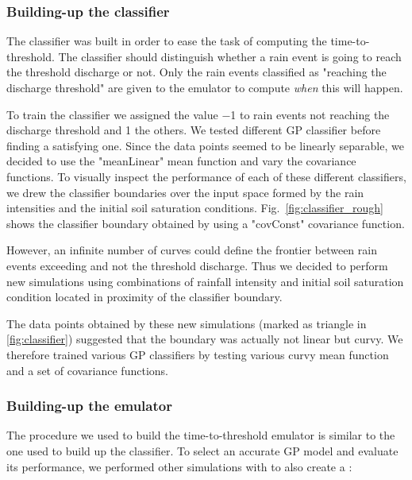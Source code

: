 \subsubsection{Building-up the classifier}

The classifier was built in order to ease the task of computing the time-to-threshold.
The classifier should distinguish whether a rain event is going to reach the threshold discharge or not.
Only the rain events classified as "reaching the discharge threshold" are given to the emulator to compute \emph{when} this will happen.

To train the classifier we assigned the value \num{-1} to rain events not reaching the discharge threshold and \num{1} the others.  
We tested different GP classifier before finding a satisfying one.
Since the data points seemed to be linearly separable, we decided to use the "meanLinear" mean function and vary
the covariance functions.
To visually inspect the performance of each of these different classifiers, we drew the classifier boundaries over the input space formed by the rain intensities and the initial soil saturation conditions. Fig.~\ref{fig:classifier_rough} shows the classifier boundary obtained by using a "covConst" covariance function.
 
However, an infinite number of curves could define the frontier between rain events exceeding and not the threshold discharge. Thus we decided to perform new simulations using combinations of rainfall intensity and initial soil saturation condition located in proximity of the classifier boundary. 

The data points obtained by these new simulations (marked as triangle in \ref{fig:classifier}) suggested that the boundary was actually not linear but curvy. 
We therefore trained various GP classifiers by testing various curvy mean function and a set of covariance functions.
 

\subsubsection{Building-up the emulator}
The procedure we used to build the time-to-threshold emulator is similar to the one used to build up the classifier.
To select an accurate GP model and evaluate its performance, we performed other simulations with  to also create a : 

